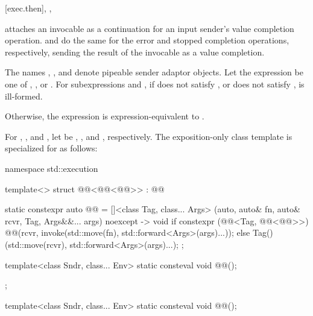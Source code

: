[exec.then]{, , }

\pnum
{} attaches an invocable as a continuation
for an input sender's value completion operation.
 and  do the same
for the error and stopped completion operations, respectively,
sending the result of the invocable as a value completion.

\pnum
The names , , and 
denote pipeable sender adaptor objects.
Let the expression  be one of
, , or .
For subexpressions  and ,
if  does not satisfy , or
 does not satisfy ,
is ill-formed.

\pnum
Otherwise,
the expression  is expression-equivalent to
.

\pnum
For , , and ,
let  be
, , and , respectively.
The exposition-only class template 
is specialized for  as follows:
\begin{codeblock}
namespace std::execution {
  template<>
  struct @@<@@<@@>> : @@ {
    static constexpr auto @@ =
      []<class Tag, class... Args>
        (auto, auto& fn, auto& rcvr, Tag, Args&&... args) noexcept -> void {
          if constexpr (@@<Tag, @@<@@>>) {
            @@(rcvr,
                          invoke(std::move(fn), std::forward<Args>(args)...));
          } else {
            Tag()(std::move(rcvr), std::forward<Args>(args)...);
          }
        };

    template<class Sndr, class... Env>
      static consteval void @@();
  };
}
\end{codeblock}

\begin{itemdecl}
template<class Sndr, class... Env>
  static consteval void @@();
\end{itemdecl}

